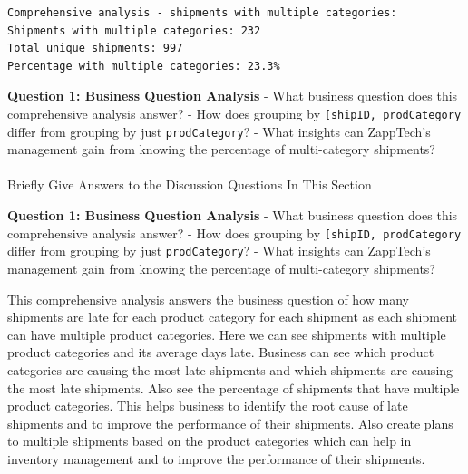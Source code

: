 \documentclass[
]{article}
\makeatletter
\let\oldparagraph\paragraph
\renewcommand{\paragraph}{
    \@ifstar
      \xxxParagraphStar
      \xxxParagraphNoStar
  }
\newcommand{\xxxParagraphStar}[1]{\oldparagraph*{#1}\mbox{}}
\newcommand{\xxxParagraphNoStar}[1]{\oldparagraph{#1}\mbox{}}
\makeatother
\begin{document}
\begin{verbatim}
Comprehensive analysis - shipments with multiple categories:
Shipments with multiple categories: 232
Total unique shipments: 997
Percentage with multiple categories: 23.3%
\end{verbatim}

\begin{tcolorbox}[enhanced jigsaw, colbacktitle=quarto-callout-important-color!10!white, toptitle=1mm, colframe=quarto-callout-important-color-frame, bottomtitle=1mm, colback=white, left=2mm, breakable, coltitle=black, bottomrule=.15mm, rightrule=.15mm, titlerule=0mm, opacityback=0, title=\textcolor{quarto-callout-important-color}{\faExclamation}\hspace{0.5em}{🤔 Discussion Questions: Answering A Business Question}, arc=.35mm, opacitybacktitle=0.6, toprule=.15mm, leftrule=.75mm]

\textbf{Question 1: Business Question Analysis} - What business question
does this comprehensive analysis answer? - How does grouping by
\texttt{{[}\textquotesingle{}shipID\textquotesingle{},\ \textquotesingle{}prodCategory\textquotesingle{}{]}}
differ from grouping by just
\texttt{\textquotesingle{}prodCategory\textquotesingle{}}? - What
insights can ZappTech's management gain from knowing the percentage of
multi-category shipments?

\end{tcolorbox}

\paragraph{Briefly Give Answers to the Discussion Questions In This
Section}\label{briefly-give-answers-to-the-discussion-questions-in-this-section-7}

\textbf{Question 1: Business Question Analysis} - What business question
does this comprehensive analysis answer? - How does grouping by
\texttt{{[}\textquotesingle{}shipID\textquotesingle{},\ \textquotesingle{}prodCategory\textquotesingle{}{]}}
differ from grouping by just
\texttt{\textquotesingle{}prodCategory\textquotesingle{}}? - What
insights can ZappTech's management gain from knowing the percentage of
multi-category shipments?

This comprehensive analysis answers the business question of how many
shipments are late for each product category for each shipment as each
shipment can have multiple product categories. Here we can see shipments
with multiple product categories and its average days late. Business can
see which product categories are causing the most late shipments and
which shipments are causing the most late shipments. Also see the
percentage of shipments that have multiple product categories. This
helps business to identify the root cause of late shipments and to
improve the performance of their shipments. Also create plans to
multiple shipments based on the product categories which can help in
inventory management and to improve the performance of their shipments.
\end{document}
